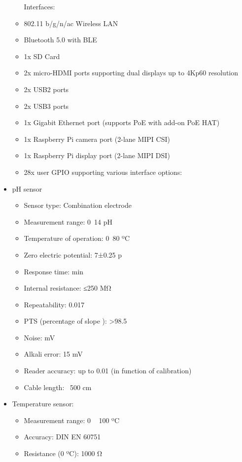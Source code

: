 \begin{itemize}
\begin{itemize}
        Interfaces: 
        \item 802.11 b/g/n/ac Wireless LAN
        \item Bluetooth 5.0 with BLE
        \item 1x SD Card
        \item 2x micro-HDMI ports supporting dual displays up to 4Kp60 resolution
        \item 2x USB2 ports
        \item 2x USB3 ports
        \item 1x Gigabit Ethernet port (supports PoE with add-on PoE HAT)
        \item 1x Raspberry Pi camera port (2-lane MIPI CSI)
        \item 1x Raspberry Pi display port (2-lane MIPI DSI)
        \item 28x user GPIO supporting various interface options:
    \end{itemize}
    \item pH sensor \\
    \begin{itemize}
        \item Sensor type: Combination electrode
        \item Measurement range: 0~14 pH
        \item Temperature of operation: 0~80 ºC
        \item Zero electric potential: 7±0.25 p
        \item Response time:  min
        \item Internal resistance: ≤250 MΩ
        \item Repeatability: 0.017
        \item PTS (percentage of slope ): >98.5
        \item Noise:  mV
        \item Alkali error: 15 mV
        \item Reader accuracy: up to 0.01 (in function of calibration)
        \item Cable length: ~500 cm
    \end{itemize}
    \item Temperature sensor: \\
    \begin{itemize}
        \item Measurement range: 0 ~ 100 ºC
        \item Accuracy: DIN EN 60751
        \item Resistance (0 ºC): 1000 Ω

\end{itemize}
\end{itemize}
